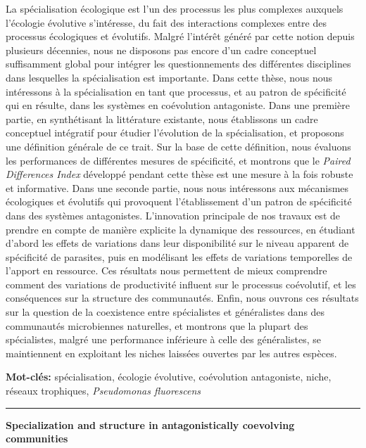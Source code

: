 {La spécialisation écologique est l'un des processus les plus complexes auxquels l'écologie évolutive s'intéresse, du fait des interactions complexes entre des processus écologiques et évolutifs. Malgré l'intérêt généré par cette notion depuis plusieurs décennies, nous ne disposons pas encore d'un cadre conceptuel suffisamment global pour intégrer les questionnements des différentes disciplines dans lesquelles la spécialisation est importante. Dans cette thèse, nous nous intéressons à la spécialisation en tant que processus, et au patron de spécificité qui en résulte, dans les systèmes en coévolution antagoniste. Dans une première partie, en synthétisant la littérature existante, nous établissons un cadre conceptuel intégratif pour étudier l'évolution de la spécialisation, et proposons une définition générale de ce trait. Sur la base de cette définition, nous évaluons les performances de différentes mesures de spécificité, et montrons que le \emph{Paired Differences Index} développé pendant cette thèse est une mesure à la fois robuste et informative. Dans une seconde partie, nous nous intéressons aux mécanismes écologiques et évolutifs qui provoquent l'établissement d'un patron de spécificité dans des systèmes antagonistes. L'innovation principale de nos travaux est de prendre en compte de manière explicite la dynamique des ressources, en étudiant d'abord les effets de variations dans leur disponibilité sur le niveau apparent de spécificité de parasites, puis en modélisant les effets de variations temporelles de l'apport en ressource. Ces résultats nous permettent de mieux comprendre comment des variations de productivité influent sur le processus coévolutif, et les conséquences sur la structure des communautés. Enfin, nous ouvrons ces résultats sur la question de la coexistence entre spécialistes et généralistes dans des communautés microbiennes naturelles, et montrons que la plupart des spécialistes, malgré une performance inférieure à celle des généralistes, se maintiennent en exploitant les niches laissées ouvertes par les autres espèces.

\noindent\textbf{Mot-clés:} spécialisation, écologie évolutive, coévolution antagoniste, niche, réseaux trophiques, \emph{Pseudomonas fluorescens}}
\vfill
\hrule
\vfill
\noindent\textbf{\sffamily Specialization and structure in antagonistically coevolving communities}

